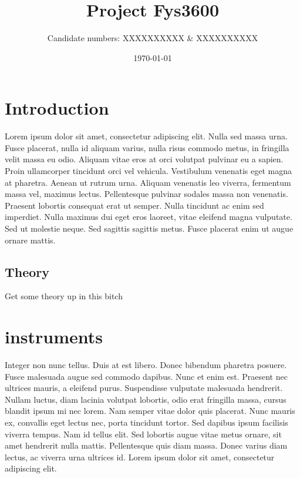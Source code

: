 \documentclass[norsk,a4paper,12pt]{article}
\title{Project Fys3600}
\author{Candidate numbers: XXXXXXXXXX \& XXXXXXXXXX}
\date{\today}
\begin{document}
\maketitle




\newpage

\tableofcontents

\section{Introduction} %
\label{sec:intro}


Lorem ipsum dolor sit amet, consectetur adipiscing elit. Nulla sed massa urna. Fusce placerat, nulla id aliquam varius, nulla risus commodo metus, in fringilla velit massa eu odio. Aliquam vitae eros at orci volutpat pulvinar eu a sapien. Proin ullamcorper tincidunt orci vel vehicula. Vestibulum venenatis eget magna at pharetra. Aenean ut rutrum urna. Aliquam venenatis leo viverra, fermentum massa vel, maximus lectus. Pellentesque pulvinar sodales massa non venenatis. Praesent lobortis consequat erat ut semper. Nulla tincidunt ac enim sed imperdiet. Nulla maximus dui eget eros laoreet, vitae eleifend magna vulputate. Sed ut molestie neque. Sed sagittis sagittis metus. Fusce placerat enim ut augue ornare mattis.

\subsection{Theory} %
\label{sub:theory}
Get some theory up in this bitch



\section{instruments} %
\label{sec:instruments}


Integer non nunc tellus. Duis at est libero. Donec bibendum pharetra posuere. Fusce malesuada augue sed commodo dapibus. Nunc et enim est. Praesent nec ultrices mauris, a eleifend purus. Suspendisse vulputate malesuada hendrerit. Nullam luctus, diam lacinia volutpat lobortis, odio erat fringilla massa, cursus blandit ipsum mi nec lorem. Nam semper vitae dolor quis placerat. Nunc mauris ex, convallis eget lectus nec, porta tincidunt tortor. Sed dapibus ipsum facilisis viverra tempus. Nam id tellus elit. Sed lobortis augue vitae metus ornare, sit amet hendrerit nulla mattis. Pellentesque quis diam massa. Donec varius diam lectus, ac viverra urna ultrices id. Lorem ipsum dolor sit amet, consectetur adipiscing elit.
\end{document}
